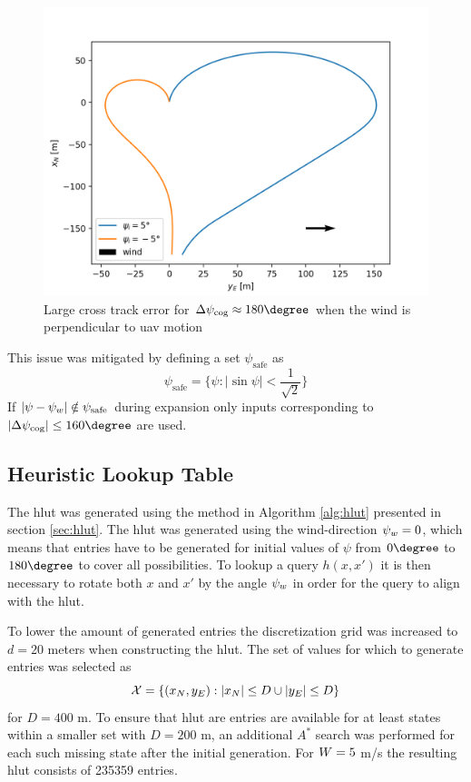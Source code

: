 \begin{figure}
    \begin{center}
        \includegraphics[width=.7\linewidth]{fig/prim_diff_hdg}        
    \end{center}
    \caption{Large cross track error for $\Delta\cog\approx180\degree$ when the wind is perpendicular to \ac{uav} motion}
    \label{fig:hdg_diff_wind}
\end{figure}

This issue was mitigated by defining a set $\psi_{\text{safe}}$ as 
\begin{equation}
    \psi_{\text{safe}}=\{\psi: |\sin\psi|<\frac{1}{\sqrt{2}}\}
\end{equation}
If $|\psi-\psi_w|\notin\psi_{\text{safe}}$ during expansion only inputs corresponding to $|\Delta\cog|\leq160\degree$ are used.

\subsection{Heuristic Lookup Table}
The \ac{hlut} was generated using the method in Algorithm \ref{alg:hlut} presented in section \ref{sec:hlut}. The \ac{hlut} was generated using the wind-direction $\psi_w=0$, which means that 
entries have to be generated for initial values of $\psi$ from $0\degree$ to $180\degree$ to cover all possibilities. To lookup a query $h(x, x')$ it is then 
necessary to rotate both $x$ and $x'$ by the angle $\psi_w$ in order for the query to align with the \ac{hlut}. 

To lower the amount of generated entries the discretization grid was increased to $d=20$ meters when constructing the \ac{hlut}. The set of 
values for which to generate entries was selected as 
\begin{equation}
    \mathcal{X}=\{(x_N,y_E): |x_N|\leq D \cup |y_E| \leq D\}
\end{equation}
for $D=400$ m. To ensure that \ac{hlut} are entries are available for at least states within a smaller set with $D=200$ m, an additional 
$A^*$ search was performed for each such missing state after the initial generation. For $W=5$ m/s the resulting \ac{hlut} consists of 235359 entries.

